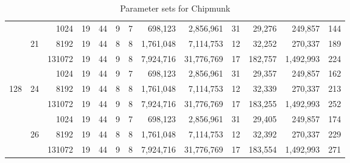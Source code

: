 \begin{table}
\begin{tabular}{ccr|c|cccrr|crr|c}
      &       &   1024 &         19 &        44 &          9 &       7 &        698,123 &  2,856,961 &    31 &       29,276 &   249,857 & 144 \\%
      &    21 &   8192 &         19 &        44 &          8 &       8 &      1,761,048 &  7,114,753 &    12 &       32,252 &   270,337 & 189 \\%
      &       & 131072 &         19 &        44 &          9 &       8 &      7,924,716 & 31,776,769 &    17 &      182,757 & 1,492,993 & 224 \\\cline{2-13}
  
      &       &   1024 &         19 &        44 &          9 &       7 &        698,123 &  2,856,961 &    31 &       29,357 &   249,857 & 162 \\%
  128 &    24 &   8192 &         19 &        44 &          8 &       8 &      1,761,048 &  7,114,753 &    12 &       32,339 &   270,337 & 213 \\%
      &       & 131072 &         19 &        44 &          9 &       8 &      7,924,716 & 31,776,769 &    17 &      183,255 & 1,492,993 & 252 \\\cline{2-13}
  
      &       &   1024 &         19 &        44 &          9 &       7 &        698,123 &  2,856,961 &    31 &       29,405 &   249,857 & 174 \\%
      &    26 &   8192 &         19 &        44 &          8 &       8 &      1,761,048 &  7,114,753 &    12 &       32,392 &   270,337 & 229 \\%
      &       & 131072 &         19 &        44 &          9 &       8 &      7,924,716 & 31,776,769 &    17 &      183,554 & 1,492,993 & 271 \\\bottomrule
    \end{tabular}
    \caption{Parameter sets for Chipmunk}\label{tab:param}
  \end{table}
\egroup

